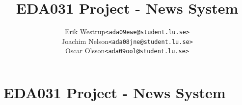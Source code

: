 \documentclass[10pt, a4paper]{article}
\title{EDA031 Project - News System}
\author{
	\begin{tabular}{l l}
		Erik Westrup & \texttt{<ada09ewe@student.lu.se>}\\
		Joachim Nelson & \texttt{<ada08jne@student.lu.se>} \\ %
		Oscar Olsson & \texttt{<ada09ool@student.lu.se>}
	\end{tabular}
}
\begin{document}
\begin{titlepage}
\maketitle
\thispagestyle{empty}	%
\end{titlepage}

\section{EDA031 Project - News System}


\emph{\cite{dummy+ref}} 
\newpage


\end{document}
